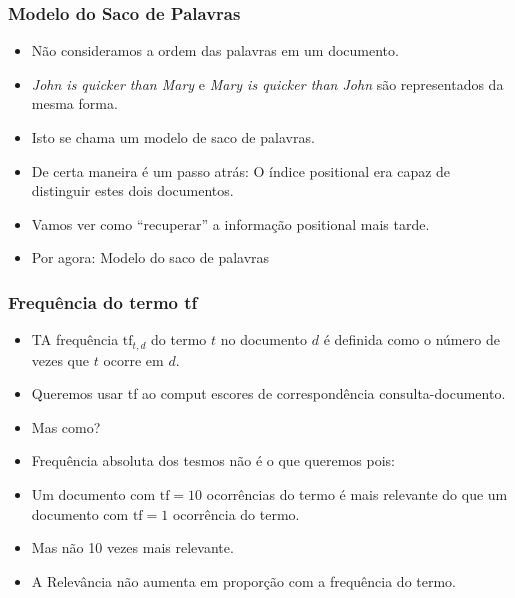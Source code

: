 \documentclass[compress]{beamer}
\def\myblue#1{\textcolor{texblue}{#1}}
\begin{document}
\begin{frame}[<+->]
\frametitle{Modelo do Saco de Palavras}
\pause[2]
\begin{itemize}
\item Não consideramos a \myblue{ordem} das palavras em um documento.
\item \emph{John is quicker than Mary} e \emph{Mary is
  quicker than John} são representados da mesma forma.
\item Isto se chama um \myblue{modelo de saco de palavras}.
\item De certa maneira é um passo atrás: O índice positional era capaz de distinguir estes dois documentos.
\item Vamos ver como ``recuperar'' a informação positional mais tarde.
\item Por agora: Modelo do saco de palavras
\end{itemize}
\end{frame}

\begin{frame}[<+->]
\frametitle{Frequência do termo \textbf{tf}}
\begin{itemize}
\item TA frequência $\mbox{tf}_{t,d}$ do termo $t$ no documento $d$ é definida como o \myblue{número de vezes que $t$ ocorre em $d$}.
\item Queremos usar tf ao comput escores de correspondência consulta-documento.
\item Mas como?
\item Frequência absoluta dos tesmos não é o que queremos pois:
\item \alert<9>{Um documento com \myblue{$\mbox{tf}=10$} ocorrências do termo é mais relevante do que um documento com \myblue{$\mbox{tf}=1$} ocorrência do termo.}

\item Mas não 10 vezes mais relevante.
\item \alert<9>{A Relevância não aumenta em proporção com a frequência do termo.}
\end{itemize}
\end{frame}
\end{document}
